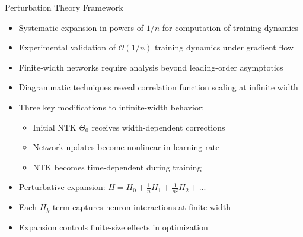 \documentclass{beamer}
\begin{document}
\begin{frame}{Perturbation Theory Framework}
  \begin{itemize}
    \item Systematic expansion in powers of $1/n$ for computation of training dynamics
    
    \item Experimental validation of $\mathcal{O}(1/n)$ training dynamics under gradient flow
    
    \item Finite-width networks require analysis beyond leading-order asymptotics
    
    \item Diagrammatic techniques reveal correlation function scaling at infinite width
    
    \item Three key modifications to infinite-width behavior:
    \begin{itemize}
      \item Initial NTK $\Theta_0$ receives width-dependent corrections
      \item Network updates become nonlinear in learning rate
      \item NTK becomes time-dependent during training
    \end{itemize}
    
    \item Perturbative expansion: $H = H_0 + \frac{1}{n}H_1 + \frac{1}{n^2}H_2 + ...$
    
    \item Each $H_k$ term captures neuron interactions at finite width
    
    \item Expansion controls finite-size effects in optimization
  \end{itemize}
\end{frame}
  
\end{document}
